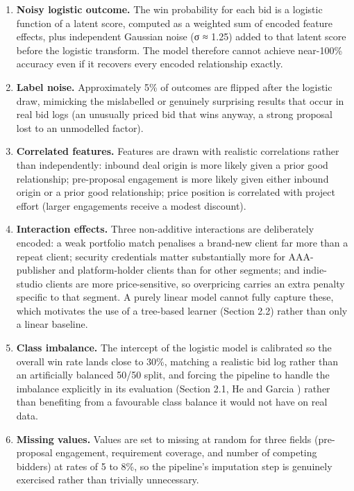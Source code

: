 \begin{enumerate}
\def\labelenumi{\arabic{enumi}.}
\tightlist
\item
  \textbf{Noisy logistic outcome.} The win probability for each bid is a
  logistic function of a latent score, computed as a weighted sum of
  encoded feature effects, plus independent Gaussian noise (σ ≈ 1.25)
  added to that latent score before the logistic transform. The model
  therefore cannot achieve near-100\% accuracy even if it recovers every
  encoded relationship exactly.
\item
  \textbf{Label noise.} Approximately 5\% of outcomes are flipped after
  the logistic draw, mimicking the mislabelled or genuinely surprising
  results that occur in real bid logs (an unusually priced bid that wins
  anyway, a strong proposal lost to an unmodelled factor).
\item
  \textbf{Correlated features.} Features are drawn with realistic
  correlations rather than independently: inbound deal origin is more
  likely given a prior good relationship; pre-proposal engagement is
  more likely given either inbound origin or a prior good relationship;
  price position is correlated with project effort (larger engagements
  receive a modest discount).
\item
  \textbf{Interaction effects.} Three non-additive interactions are
  deliberately encoded: a weak portfolio match penalises a brand-new
  client far more than a repeat client; security credentials matter
  substantially more for AAA-publisher and platform-holder clients than
  for other segments; and indie-studio clients are more price-sensitive,
  so overpricing carries an extra penalty specific to that segment. A
  purely linear model cannot fully capture these, which motivates the
  use of a tree-based learner (Section 2.2) rather than only a linear
  baseline.
\item
  \textbf{Class imbalance.} The intercept of the logistic model is
  calibrated so the overall win rate lands close to 30\%, matching a
  realistic bid log rather than an artificially balanced 50/50 split,
  and forcing the pipeline to handle the imbalance explicitly in its
  evaluation (Section 2.1, He and Garcia \citep{he2009learning}) rather
  than benefiting from a favourable class balance it would not have on
  real data.
\item
  \textbf{Missing values.} Values are set to missing at random for three
  fields (pre-proposal engagement, requirement coverage, and number of
  competing bidders) at rates of 5 to 8\%, so the pipeline's imputation
  step is genuinely exercised rather than trivially unnecessary.
\end{enumerate}

